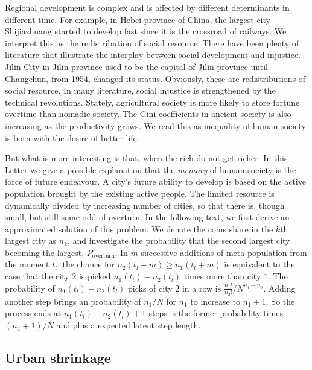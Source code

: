\documentclass[aps,prl]{revtex4-2}
\begin{document}
Regional development is complex and is affected by different determinants in different time. For example, in Hebei province of China, the largest city Shijiazhuang started to develop fast since it is the crossroad of railways. We interpret this as the redistribution of social resource. There have been plenty of literature\cite{bowles2019neolithic} that illustrate the interplay between social development and injustice. Jilin City in Jilin province used to be the capital of Jilin province until Changchun, from 1954, changed its status. Obviously, these are redistributions of social resource. In many literature, social injustice is strengthened by the technical revolutions. Stately, agricultural society is more likely to store fortune overtime than nomadic society\cite{doi:10.1086/701789}. The Gini coefficients in ancient society is also increasing as the productivity grows\cite{kohler2017greater}. We read this as inequality of human society is born with the desire of better life. 

But what is more interesting is that, when the rich do not get richer. In this Letter we give a possible explanation that the \emph{memory} of human society is the force of future endeavour. A city's future ability to develop is based on the active population brought by the existing active people. The limited resource is dynamically divided by increasing number of cities, so that there is, though small, but still some odd of overturn. In the following text, we first derive an approximated solution of this problem. We denote the coins share in the $k$th largest city as $n_k$, and investigate the probability that the second largest city becoming the largest, $P_{\text{overturn}}$. In $m$ successive additions of meta-population from the moment $t_l$, the chance for $n_2(t_l+m)\ge n_1(t_l+m)$ is equivalent to the case that the city $2$ is picked $n_1(t_l)-n_2(t_l)$ times more than city $1$. The probability of $n_1(t_l)-n_2(t_l)$ picks of city $2$ in a row is $\frac{n_1!}{n_2!}/N^{n_1-n_2}$. Adding another step brings an probability of $n_1/N$ for $n_1$ to increase to $n_1+1$. So the process ends at $n_1(t_l)-n_2(t_l)+1$ steps is the former probability times $(n_1+1)/N$ and plus a expected latent step length. 

\subsection{Urban shrinkage}
\end{document}
